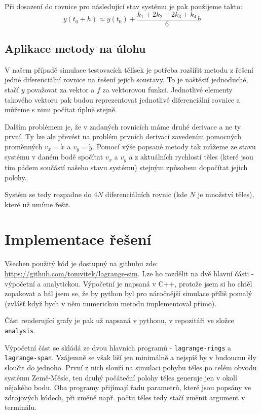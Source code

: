\documentclass[a4paper,11pt]{article}
\begin{document}
Při dosazení do rovnice pro následující stav systému je pak použijeme takto:
\begin{equation*}
    y(t_0 + h) \approx y(t_0) + \frac{k_1 + 2k_2 + 2k_3 + k_4}{6} h
\end{equation*}

\subsection{Aplikace metody na úlohu}

V našem případě simulace testovacích tělísek je potřeba rozšířit metodu z řešení jedné diferenciální
rovnice na řešení jejich soustavy. To je naštěstí jednoduché, stačí $y$ považovat za vektor a $f$ za
vektorovou funkci. Jednotlivé elementy takového vektoru pak budou reprezentovat jednotlivé diferenciální rovnice
a můžeme s nimi počítat úplně stejně.

Dalším problémem je, že v zadaných rovnicích máme druhé derivace a ne ty první. Ty lze ale převést na problém
prvních derivací zavedením pomocných proměnných $v_x = \dot{x}$ a $v_y = \dot{y}$. Pomocí výše popsané metody
tak můžeme ze stavu systému v daném bodě spočítat $v_x$ a $v_y$ a z aktuálních rychlostí těles (které jsou tím 
pádem součástí našeho stavu systému) stejným způsobem dopočítat jejich polohy.

Systém se tedy rozpadne do $4N$ diferenciálních rovnic (kde $N$ je množství těles), které už umíme řešit.

\section{Implementace řešení}

Všechen použitý kód je dostupný na githubu zde: \url{https://github.com/tomvitek/lagrange-sim}.
Lze ho rozdělit na dvě hlavní části - výpočetní a analytickou. Výpočetní je napsaná v C++, protože
jsem si ho chtěl zopakovat a bál jsem se, že by python byl pro náročnější simulace příliš pomalý
(zvlášť když bych v něm numerickou metodu implementoval přímo).

Část renderující grafy je pak už napsaná v pythonu, v repozitáři ve složce \texttt{analysis}.

Výpočetní část se skládá ze dvou hlavních programů - \texttt{lagrange-rings} a \texttt{lagrange-span}.
Vzájemně se však liší jen minimálně a nejspíš by v budoucnu šly sloučit do jednoho. První z nich slouží
na simulaci pohybu těles po celém obvodu systému Země-Měsíc, ten druhý počáteční polohy těles generuje jen v okolí nějakého bodu.
Oba programy přijímají řadu parametrů, které jsou popsány ve zdrojových kódech, při změně např. počtu těles tedy stačí
změnit argument v terminálu.
\end{document}

